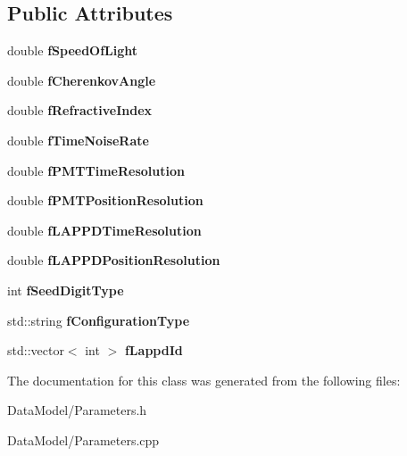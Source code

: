\subsection*{Public Attributes}
\begin{DoxyCompactItemize}
\item 
\hypertarget{classParameters_a0ab2806085b853d149fd6e4c8e569cca}{
double {\bfseries fSpeedOfLight}}
\label{classParameters_a0ab2806085b853d149fd6e4c8e569cca}

\item 
\hypertarget{classParameters_ab8ef3df2fb41ab745ff7647dbc8cc50b}{
double {\bfseries fCherenkovAngle}}
\label{classParameters_ab8ef3df2fb41ab745ff7647dbc8cc50b}

\item 
\hypertarget{classParameters_a71d8363c51b45b3eea2845316a8a4f5d}{
double {\bfseries fRefractiveIndex}}
\label{classParameters_a71d8363c51b45b3eea2845316a8a4f5d}

\item 
\hypertarget{classParameters_ad90255179abb7853ac6d16e5905aa6c6}{
double {\bfseries fTimeNoiseRate}}
\label{classParameters_ad90255179abb7853ac6d16e5905aa6c6}

\item 
\hypertarget{classParameters_ace595d49d4d72a00af0becfcb7c92dad}{
double {\bfseries fPMTTimeResolution}}
\label{classParameters_ace595d49d4d72a00af0becfcb7c92dad}

\item 
\hypertarget{classParameters_a94b1d9e403f02af9ba58763803eef51e}{
double {\bfseries fPMTPositionResolution}}
\label{classParameters_a94b1d9e403f02af9ba58763803eef51e}

\item 
\hypertarget{classParameters_a92dbf523ca3a928c72e18cff5e93f4cb}{
double {\bfseries fLAPPDTimeResolution}}
\label{classParameters_a92dbf523ca3a928c72e18cff5e93f4cb}

\item 
\hypertarget{classParameters_a32904c328c259d8eb7760799d2209cee}{
double {\bfseries fLAPPDPositionResolution}}
\label{classParameters_a32904c328c259d8eb7760799d2209cee}

\item 
\hypertarget{classParameters_a681104d5b6cc6f589095f5759b7e0480}{
int {\bfseries fSeedDigitType}}
\label{classParameters_a681104d5b6cc6f589095f5759b7e0480}

\item 
\hypertarget{classParameters_aed4dffbeb510be19702f836a75cecc7f}{
std::string {\bfseries fConfigurationType}}
\label{classParameters_aed4dffbeb510be19702f836a75cecc7f}

\item 
\hypertarget{classParameters_a2e0a3f1bbb8ffa7e40f84d09452f1f41}{
std::vector$<$ int $>$ {\bfseries fLappdId}}
\label{classParameters_a2e0a3f1bbb8ffa7e40f84d09452f1f41}

\end{DoxyCompactItemize}


The documentation for this class was generated from the following files:\begin{DoxyCompactItemize}
\item 
DataModel/Parameters.h\item 
DataModel/Parameters.cpp\end{DoxyCompactItemize}
